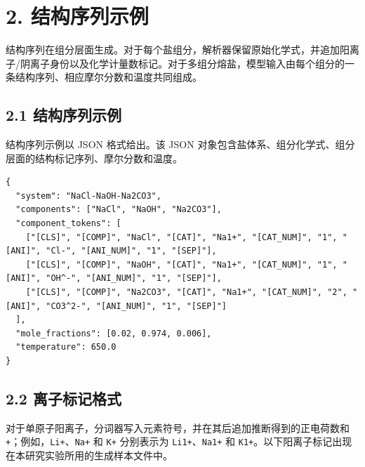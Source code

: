 \documentclass[12pt]{article}
\providecommand{\passthrough}[1]{#1}
\begin{document}
\section*{2. 结构序列示例}\label{structural-sequence-examples}

结构序列在组分层面生成。对于每个盐组分，解析器保留原始化学式，并追加阳离子/阴离子身份以及化学计量数标记。对于多组分熔盐，模型输入由每个组分的一条结构序列、相应摩尔分数和温度共同组成。

\subsection*{2.1 结构序列示例}\label{structural-sequence-example}

结构序列示例以 JSON 格式给出。该 JSON 对象包含盐体系、组分化学式、组分层面的结构标记序列、摩尔分数和温度。

\noindent\begin{minipage}{\linewidth}
\smallskip
\begin{lstlisting}
{
  "system": "NaCl-NaOH-Na2CO3",
  "components": ["NaCl", "NaOH", "Na2CO3"],
  "component_tokens": [
    ["[CLS]", "[COMP]", "NaCl", "[CAT]", "Na1+", "[CAT_NUM]", "1", "[ANI]", "Cl-", "[ANI_NUM]", "1", "[SEP]"],
    ["[CLS]", "[COMP]", "NaOH", "[CAT]", "Na1+", "[CAT_NUM]", "1", "[ANI]", "OH^-", "[ANI_NUM]", "1", "[SEP]"],
    ["[CLS]", "[COMP]", "Na2CO3", "[CAT]", "Na1+", "[CAT_NUM]", "2", "[ANI]", "CO3^2-", "[ANI_NUM]", "1", "[SEP]"]
  ],
  "mole_fractions": [0.02, 0.974, 0.006],
  "temperature": 650.0
}
\end{lstlisting}
\end{minipage}

\subsection*{2.2 离子标记格式}\label{ion-token-format}

对于单原子阳离子，分词器写入元素符号，并在其后追加推断得到的正电荷数和 \passthrough{\lstinline!+!}；例如，\passthrough{\lstinline!Li+!}、\passthrough{\lstinline!Na+!} 和 \passthrough{\lstinline!K+!} 分别表示为 \passthrough{\lstinline!Li1+!}、\passthrough{\lstinline!Na1+!} 和 \passthrough{\lstinline!K1+!}。以下阳离子标记出现在本研究实验所用的生成样本文件中。
\end{document}
